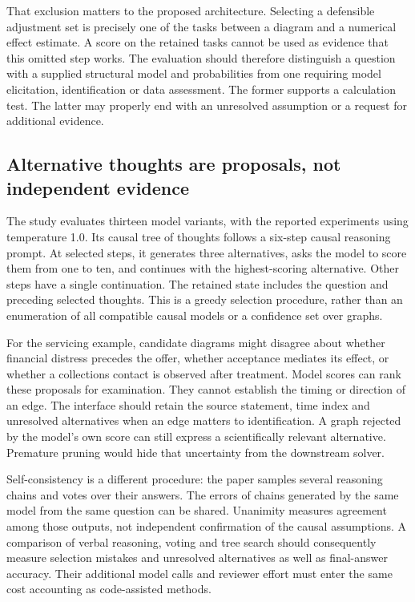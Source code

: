 That exclusion matters to the proposed architecture. Selecting a defensible
adjustment set is precisely one of the tasks between a diagram and a numerical
effect estimate. A score on the retained tasks cannot be used as evidence that
this omitted step works. The evaluation should therefore distinguish a
question with a supplied structural model and probabilities from one requiring
model elicitation, identification or data assessment. The former supports a
calculation test. The latter may properly end with an unresolved assumption or
a request for additional evidence.

\subsection{Alternative thoughts are proposals, not independent evidence}
\label{exec21:prophets-search}
The study evaluates thirteen model variants, with the reported experiments
using temperature 1.0. Its causal tree of thoughts follows a six-step causal
reasoning prompt. At selected steps, it generates three alternatives, asks the
model to score them from one to ten, and continues with the highest-scoring
alternative. Other steps have a single continuation. The retained state includes
the question and preceding selected thoughts. This is a greedy selection
procedure, rather than an enumeration of all compatible causal models or a
confidence set over graphs.\citep{exec21_prophets}

For the servicing example, candidate diagrams might disagree about whether
financial distress precedes the offer, whether acceptance mediates its effect,
or whether a collections contact is observed after treatment. Model scores can
rank these proposals for examination. They cannot establish the timing or
direction of an edge. The interface should retain the source statement,
time index and unresolved alternatives when an edge matters to identification.
A graph rejected by the model's own score can still express a scientifically
relevant alternative. Premature pruning would hide that uncertainty from the
downstream solver.

Self-consistency is a different procedure: the paper samples several reasoning
chains and votes over their answers. The errors of chains generated by the same
model from the same question can be shared. Unanimity measures agreement among
those outputs, not independent confirmation of the causal assumptions. A
comparison of verbal reasoning, voting and tree search should consequently
measure selection mistakes and unresolved alternatives as well as final-answer
accuracy. Their additional model calls and reviewer effort must enter the same
cost accounting as code-assisted methods.\citep{exec21_prophets}

